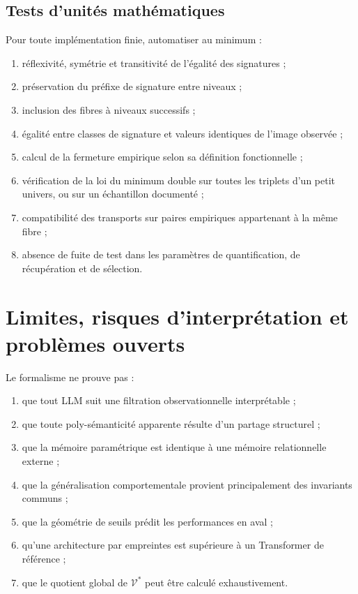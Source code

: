 \documentclass[11pt,a4paper]{article}
\theoremstyle{remark}
\newcommand{\V}{\mathcal V}
\begin{document}
\subsection{Tests d'unités mathématiques}
Pour toute implémentation finie, automatiser au minimum :
\begin{enumerate}[label=\arabic*.]
  \item réflexivité, symétrie et transitivité de l'égalité des signatures ;
  \item préservation du préfixe de signature entre niveaux ;
  \item inclusion des fibres à niveaux successifs ;
  \item égalité entre classes de signature et valeurs identiques de l'image observée ;
  \item calcul de la fermeture empirique selon sa définition fonctionnelle ;
  \item vérification de la loi du minimum double sur toutes les triplets d'un petit univers, ou sur un échantillon documenté ;
  \item compatibilité des transports sur paires empiriques appartenant à la même fibre ;
  \item absence de fuite de test dans les paramètres de quantification, de récupération et de sélection.
\end{enumerate}

\section{Limites, risques d'interprétation et problèmes ouverts}

Le formalisme ne prouve pas :
\begin{enumerate}[label=\arabic*.]
  \item que tout LLM suit une filtration observationnelle interprétable ;
  \item que toute poly-sémanticité apparente résulte d'un partage structurel ;
  \item que la mémoire paramétrique est identique à une mémoire relationnelle externe ;
  \item que la généralisation comportementale provient principalement des invariants communs ;
  \item que la géométrie de seuils prédit les performances en aval ;
  \item qu'une architecture par empreintes est supérieure à un Transformer de référence ;
  \item que le quotient global de $\V^*$ peut être calculé exhaustivement.
\end{enumerate}
\end{document}

